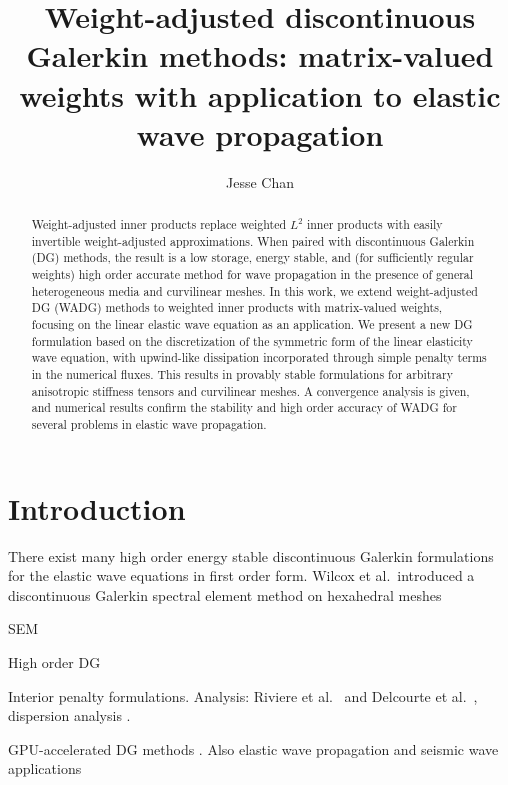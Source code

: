\documentclass{siamart0216}
\date{}
\author{Jesse Chan}
\title{Weight-adjusted discontinuous Galerkin methods: matrix-valued weights with application to elastic wave propagation}
\begin{document}
\maketitle

\begin{abstract}
Weight-adjusted inner products \cite{chan2016weight1,chan2016weight2} replace weighted $L^2$ inner products with easily invertible weight-adjusted approximations.  When paired with discontinuous Galerkin (DG) methods, the result is a low storage, energy stable, and (for sufficiently regular weights) high order accurate method for wave propagation in the presence of general heterogeneous media and curvilinear meshes.  In this work, we extend weight-adjusted DG (WADG) methods to weighted inner products with matrix-valued weights, focusing on the linear elastic wave equation as an application.  We present a new DG formulation based on the discretization of the symmetric form of the linear elasticity wave equation, with upwind-like dissipation incorporated through simple penalty terms in the numerical fluxes.  This results in provably stable formulations for arbitrary anisotropic stiffness tensors and curvilinear meshes.  A convergence analysis is given, and numerical results confirm the stability and high order accuracy of WADG for several problems in elastic wave propagation.  
\end{abstract}


\section{Introduction}

There exist many high order energy stable discontinuous Galerkin formulations for the elastic wave equations in first order form.  Wilcox et al.\ introduced a discontinuous Galerkin spectral element method on hexahedral meshes 

SEM \cite{komatitsch2010high,wilcox2010high} 

High order DG \cite{kaser2006arbitrary, dumbser2006arbitrary, de2007arbitrary,ye2016discontinuous}

Interior penalty formulations.  Analysis: Riviere et al.\ \cite{riviere2003discontinuous,riviere2007discontinuous} and Delcourte et al.\ \cite{delcourte2009high,delcourte2015analysis}, dispersion analysis \cite{de2008interior,antonietti2016high}.  

GPU-accelerated DG methods \cite{klockner2009nodal,godel2010gpu,godel2010scalability}.  Also elastic wave propagation and seismic wave applications \cite{modave2015nodal,modave2016gpu}
\end{document}
